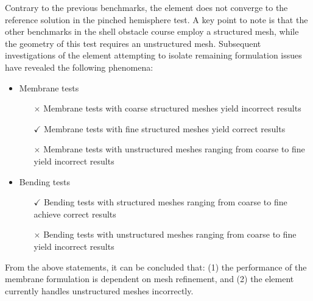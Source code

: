 Contrary to the previous benchmarks, the element does not converge to the reference solution in the pinched hemisphere test.  A key point to note is that the other benchmarks in the shell obstacle course employ a structured mesh, while the geometry of this test requires an unstructured mesh. Subsequent investigations of the element attempting to isolate remaining formulation issues have revealed the following phenomena:

\begin{itemize}
	\item Membrane tests
	\begin{itemize}
		\item[{$\times$}] Membrane tests with coarse structured meshes yield incorrect results
		\item[{$\checkmark$}] Membrane tests with fine structured meshes yield correct results
		\item[{$\times$}] Membrane tests with unstructured meshes ranging from coarse to fine yield incorrect results
	\end{itemize}
	
	\item Bending tests
	\begin{itemize}
		\item[{$\checkmark$}] Bending tests with structured meshes ranging from coarse to fine achieve correct results
		\item[{$\times$}] Bending tests with unstructured meshes ranging from coarse to fine yield incorrect results
	\end{itemize}	
\end{itemize}

From the above statements, it can be concluded that: (1) the performance of the membrane formulation is dependent on mesh refinement, and (2) the element currently handles unstructured meshes incorrectly.



















